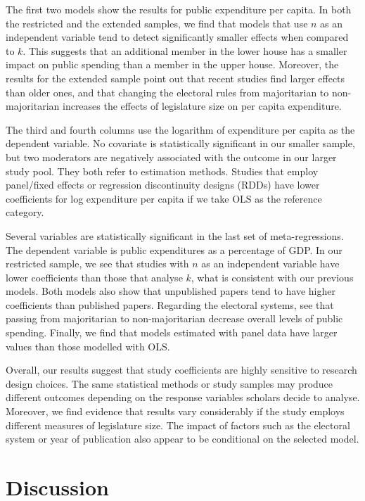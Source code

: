 \documentclass[a4paper,12pt]{article}
\begin{document}
The first two models show the results for public expenditure per capita. In both
the restricted and the extended samples, we find that models that use $n$ as an
independent variable tend to detect significantly smaller effects when compared
to $k$. This suggests that an additional member in the lower house has a smaller
impact on public spending than a member in the upper house. Moreover, the
results for the extended sample point out that recent studies find larger
effects than older ones, and that changing the electoral rules from majoritarian
to non-majoritarian increases the effects of legislature size on per capita
expenditure.

The third and fourth columns use the logarithm of expenditure per capita as the
dependent variable. No covariate is statistically significant in our smaller
sample, but two moderators are negatively associated with the outcome in our
larger study pool. They both refer to estimation methods. Studies that employ
panel/fixed effects or regression discontinuity designs (RDDs) have lower
coefficients for log expenditure per capita if we take OLS as the reference
category.

Several variables are statistically significant in the last set of
meta-regressions. The dependent variable is public expenditures as a percentage
of GDP. In our restricted sample, we see that studies with $n$ as an
independent variable have lower coefficients than those that analyse $k$, what
is consistent with our previous models. Both models also show that unpublished
papers tend to have higher coefficients than published papers. Regarding the
electoral systems, see that passing from majoritarian to non-majoritarian
decrease overall levels of public spending. Finally, we find that models
estimated with panel data have larger values than those modelled with OLS.

Overall, our results suggest that study coefficients are highly sensitive to
research design choices. The same statistical methods or study samples may
produce different outcomes depending on the response variables scholars decide
to analyse. Moreover, we find evidence that results vary considerably if the
study employs different measures of legislature size. The impact of factors such
as the electoral system or year of publication also appear to be conditional on
the selected model.

\section{Discussion}
\label{sec:discussion}
\end{document}
